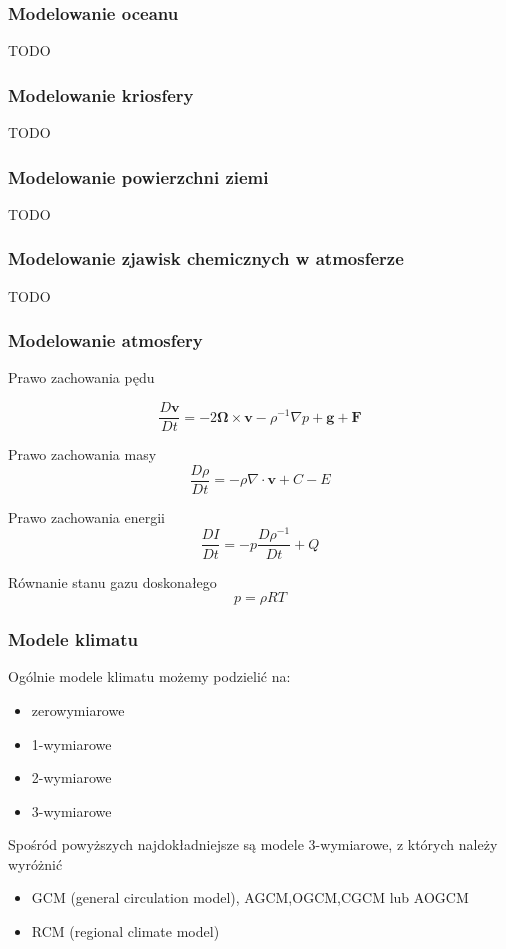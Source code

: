 \documentclass{beamer}
\begin{document}
\begin{frame}
	\frametitle{Modelowanie oceanu}
	TODO
	
\end{frame}


\begin{frame}
	\frametitle{Modelowanie kriosfery}
	TODO
	
\end{frame}


\begin{frame}
	\frametitle{Modelowanie powierzchni ziemi}
	TODO
	
\end{frame}


\begin{frame}
	\frametitle{Modelowanie zjawisk chemicznych w atmosferze}
	TODO
	
\end{frame}



\begin{frame}
	\frametitle{Modelowanie atmosfery}
	\begin{block}{Prawo zachowania pędu}
		
		\[\frac{D\mathbf{v}}{Dt} = -2 \mathbf{\Omega} \times \mathbf{v} - \rho^{-1}
		\nabla p + \mathbf{g} + \mathbf{F}
		\]
		
	\end{block}
	
	\begin{block}{Prawo zachowania masy}
		\[\frac{D\rho}{Dt} = -\rho\nabla \cdot \mathbf{v} + C - E
		\]
	\end{block}
	
	\begin{block}{Prawo zachowania energii}
		\[\frac{DI}{Dt} = -p\frac{D\rho^{-1}}{Dt} + Q
		\]
	\end{block}
	
	\begin{block}{Równanie stanu gazu doskonałego}		
		\[p=\rho RT
		\]
	\end{block}
	
\end{frame}




\begin{frame}
	\frametitle{Modele klimatu}
	Ogólnie modele klimatu możemy podzielić na:
	\begin{itemize}
		\item zerowymiarowe
		\item 1-wymiarowe
		\item 2-wymiarowe
		\item 3-wymiarowe
	\end{itemize}
	\vspace{0.5cm}
	Spośród powyższych najdokładniejsze są modele 3-wymiarowe, z których należy wyróżnić
	\begin{itemize}
		\item GCM (general circulation model), AGCM,OGCM,CGCM lub AOGCM
		\item RCM (regional climate model)
	\end{itemize}
	
\end{frame}
\end{document}

